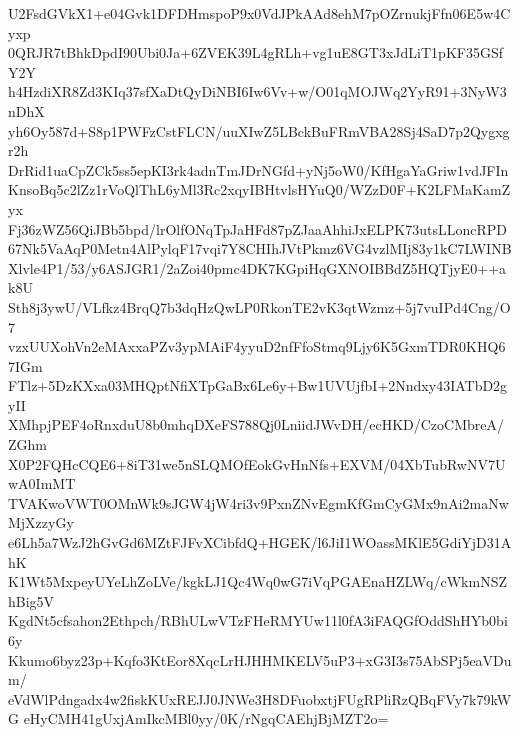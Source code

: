 U2FsdGVkX1+e04Gvk1DFDHmspoP9x0VdJPkAAd8ehM7pOZrnukjFfn06E5w4Cyxp
0QRJR7tBhkDpdI90Ubi0Ja+6ZVEK39L4gRLh+vg1uE8GT3xJdLiT1pKF35GSfY2Y
h4HzdiXR8Zd3KIq37sfXaDtQyDiNBI6Iw6Vv+w/O01qMOJWq2YyR91+3NyW3nDhX
yh6Oy587d+S8p1PWFzCstFLCN/uuXIwZ5LBckBuFRmVBA28Sj4SaD7p2Qygxgr2h
DrRid1uaCpZCk5ss5epKI3rk4adnTmJDrNGfd+yNj5oW0/KfHgaYaGriw1vdJFIn
KnsoBq5c2lZz1rVoQlThL6yMl3Rc2xqyIBHtvlsHYuQ0/WZzD0F+K2LFMaKamZyx
Fj36zWZ56QiJBb5bpd/lrOlfONqTpJaHFd87pZJaaAhhiJxELPK73utsLLoncRPD
67Nk5VaAqP0Metn4AlPylqF17vqi7Y8CHIhJVtPkmz6VG4vzlMIj83y1kC7LWINB
Xlvle4P1/53/y6ASJGR1/2aZoi40pmc4DK7KGpiHqGXNOIBBdZ5HQTjyE0++ak8U
Sth8j3ywU/VLfkz4BrqQ7b3dqHzQwLP0RkonTE2vK3qtWzmz+5j7vuIPd4Cng/O7
vzxUUXohVn2eMAxxaPZv3ypMAiF4yyuD2nfFfoStmq9Ljy6K5GxmTDR0KHQ67IGm
FTlz+5DzKXxa03MHQptNfiXTpGaBx6Le6y+Bw1UVUjfbI+2Nndxy43IATbD2gyII
XMhpjPEF4oRnxduU8b0mhqDXeFS788Qj0LniidJWvDH/ecHKD/CzoCMbreA/ZGhm
X0P2FQHcCQE6+8iT31we5nSLQMOfEokGvHnNfs+EXVM/04XbTubRwNV7UwA0ImMT
TVAKwoVWT0OMnWk9sJGW4jW4ri3v9PxnZNvEgmKfGmCyGMx9nAi2maNwMjXzzyGy
e6Lh5a7WzJ2hGvGd6MZtFJFvXCibfdQ+HGEK/l6JiI1WOassMKlE5GdiYjD31AhK
K1Wt5MxpeyUYeLhZoLVe/kgkLJ1Qc4Wq0wG7iVqPGAEnaHZLWq/cWkmNSZhBig5V
KgdNt5cfsahon2Ethpch/RBhULwVTzFHeRMYUw11l0fA3iFAQGfOddShHYb0bi6y
Kkumo6byz23p+Kqfo3KtEor8XqcLrHJHHMKELV5uP3+xG3I3s75AbSPj5eaVDum/
eVdWlPdngadx4w2fiskKUxREJJ0JNWe3H8DFuobxtjFUgRPliRzQBqFVy7k79kWG
eHyCMH41gUxjAmIkcMBl0yy/0K/rNgqCAEhjBjMZT2o=
